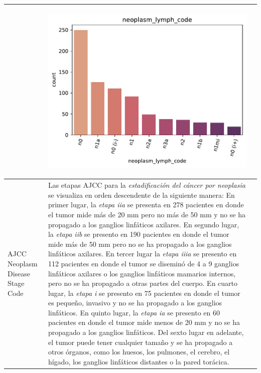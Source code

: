 \begin{table}[!htb]
\begin{threeparttable}
\begin{tabular}{p{2.5cm} p{7cm} p{6.5cm}}
			& \begin{center}\includegraphics[width=1\linewidth]{NOTEBOOK/IMAGENES_DESCRIPTIVAS/3_neoplasm_lymph_code}\end{center}
			\\ \hline
			AJCC Neoplasm Disease Stage Code
			& Las etapas AJCC para la \textit{estadificación del cáncer por neoplasia} se visualiza en orden descendente de la siguiente manera: En primer lugar, la \textit{etapa iia} se presenta en 278 pacientes en donde el tumor mide más de 20 mm pero no más de 50 mm y no se ha propagado a los ganglios linfáticos axilares. En segundo lugar, la \textit{etapa iib} se presento en 190 pacientes en donde el tumor mide más de 50 mm pero no se ha propagado a los ganglios linfáticos axilares. En tercer lugar la \textit{etapa iiia} se presento en 112 pacientes en donde el tumor se diseminó de 4 a 9 ganglios linfáticos axilares o los ganglios linfáticos mamarios internos, pero no se ha propagado a otras partes del cuerpo. En cuarto lugar, la \textit{etapa i} se presento en 75 pacientes  en donde el tumor es pequeño, invasivo y no se ha propagado a los ganglios linfáticos. En quinto lugar, la \textit{etapa ia} se presento en 60 pacientes en donde el tumor mide menos de 20 mm  y no se ha propagado a los ganglios linfáticos. Del sexto lugar en adelante, el tumor puede tener cualquier tamaño y se ha propagado a otros órganos, como los huesos, los pulmones, el cerebro, el hígado, los ganglios linfáticos distantes o la pared torácica.
			

\end{tabular}
\end{threeparttable}
\end{table}
